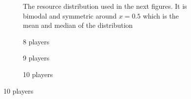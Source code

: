 \documentclass{article}
\begin{document}
                \begin{figure}[ht!] 
                    \centering
                    \begin{subfigure}[b]{0.4\linewidth}
                        \centering
                        
                        \caption{The resource distribution used in the next figures. It is bimodal and symmetric around $x=0.5$ which is the mean and median of the distribution}
                        \label{fig3:a}
                    \end{subfigure}
                    \begin{subfigure}[b]{0.3\linewidth}
                        \centering
                        
                        \caption{8 players} 
                        \label{fig3:b} 
                        \vspace{4ex}
                    \end{subfigure}%
                    \begin{subfigure}[b]{0.3\linewidth}
                        \centering
                         
                        \caption{9 players} 
                        \label{fig3:c} 
                        \vspace{4ex}
                    \end{subfigure} 
                    \begin{subfigure}[b]{0.3\linewidth}
                        \centering
                         
                        \caption{10 players} 
                        \label{fig3:d}
                        \vspace{4ex}
                    \end{subfigure}%
                    

\end{figure}
\end{document}
